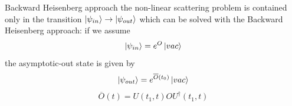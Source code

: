 \documentclass{beamer}
\begin{document}
\begin{frame}[plain]{Backward Heisenberg approach}
the non-linear scattering problem is contained only in the transition $\ket{\psi_{in}} \to \ket{\psi_{out}}$
which can be solved with the Backward Heisenberg approach:
if we assume \begin{equation}\ket{\psi_{in}} = e^O \ket{vac}\end{equation}
the asymptotic-out state is given by
\begin{equation}\ket{\psi_{out}} =  e^{\overline{O}(t_0)}\ket{vac}\end{equation}
\begin{equation}\label{dynamicO}\overline{O}(t) = U(t_1,t)OU^\dagger(t_1,t)\end{equation}



\end{frame}
\end{document}
